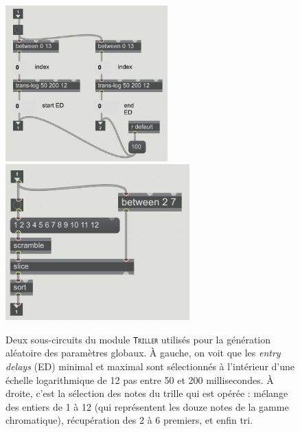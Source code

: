 \documentclass[a4paper,12pt]{article}
\newcommand{\module}[1]{\texttt{\textsc{#1}}}
\begin{document}
\begin{figure}[!h]
\begin{center}
\includegraphics[height=6cm]{images/trillerED.jpg}~~~\includegraphics[height=6cm]{images/trillernotes.jpg}
\caption{\footnotesize Deux sous-circuits du module \module{Triller} utilisés pour la génération aléatoire des paramètres globaux. À gauche, on voit que les \emph{entry delays} (ED) minimal et maximal sont sélectionnés à l'intérieur d'une échelle logarithmique de 12 pas entre 50 et 200 millisecondes. À droite, c'est la sélection des notes du trille qui est opérée : mélange des entiers de 1 à 12 (qui représentent les douze notes de la gamme chromatique), récupération des 2 à 6 premiers, et enfin tri.}
\label{trillerf}
\end{center}
\end{figure}
\end{document}
